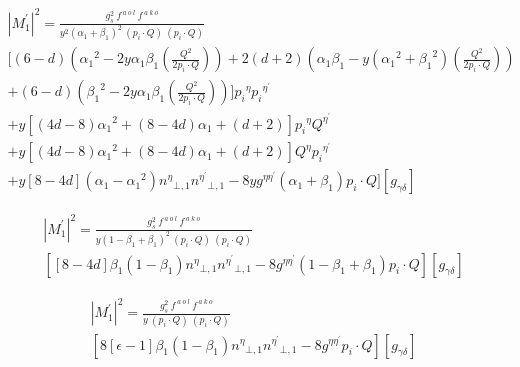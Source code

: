 \begin{equation}
\begin{split}
{|{M}^{\prime}_1|}^2 =\frac{g_s^2 \:f^{\:a\:o\:l}\: f^{\:a\:k\:o}}{y^2({\alpha_1}+\beta_1)^2\:(p_i\cdot Q) \:(p_i\cdot Q)} \\
[(6-d)({\alpha_1}^2 -2y\alpha_1 \beta_1(\frac{Q^2}{2p_i \cdot Q}))+2(d+2)({\alpha_1}{\beta}_1 -y({\alpha_1}^2 +{\beta_1}^2)(\frac{Q^2}{2p_i \cdot Q}))\\+(6-d)({\beta_1}^2 -2y\alpha_1 \beta_1(\frac{Q^2}{2p_i \cdot Q})) ]{p_i}^{\eta}{p_i}^{{\eta}^{\prime}}\\
+y[(4d-8){\alpha_1}^2+(8-4d){\alpha}_1 +(d+2)] {p_i}^{\eta}{Q}^{{\eta}^{\prime}}\\
+y[(4d-8){\alpha_1}^2+(8-4d){\alpha}_1 +(d+2)]  {Q}^{\eta}{p_i}^{{\eta}^{\prime}}\\+y[8-4d](\alpha_1-{\alpha_1}^2){n^{{\eta}}}_{\bot,1}{n^{{\eta}^{\prime}}}_{\bot,1}-8yg^{{\eta}{{\eta}^{\prime}}}({\alpha}_1 +{\beta}_1) p_i \cdot Q][g_{{\gamma}{{\delta}}}]
\end{split}
\end{equation}

\begin{equation}
\begin{split}
{|{M}^{\prime}_1|}^2 =\frac{g_s^2 \:f^{\:a\:o\:l}\: f^{\:a\:k\:o}}{y(1-{\beta_1}+\beta_1)^2\:(p_i\cdot Q) \:(p_i\cdot Q)} \\
[[8-4d]{\beta_1}(1-\beta_1){n^{{\eta}}}_{\bot,1}{n^{{\eta}^{\prime}}}_{\bot,1}-8g^{{\eta}{{\eta}^{\prime}}}(1-{\beta}_1 +{\beta}_1) p_i \cdot Q][g_{{\gamma}{{\delta}}}]
\end{split}
\end{equation}

\begin{equation}
\begin{split}
{|{M}^{\prime}_1|}^2 =\frac{g_s^2 \:f^{\:a\:o\:l}\: f^{\:a\:k\:o}}{y\:(p_i\cdot Q) \:(p_i\cdot Q)} \\
[8[\epsilon-1]{\beta_1}(1-\beta_1){n^{{\eta}}}_{\bot,1}{n^{{\eta}^{\prime}}}_{\bot,1}-8g^{{\eta}{{\eta}^{\prime}}} p_i \cdot Q][g_{{\gamma}{{\delta}}}]
\end{split}
\end{equation}







